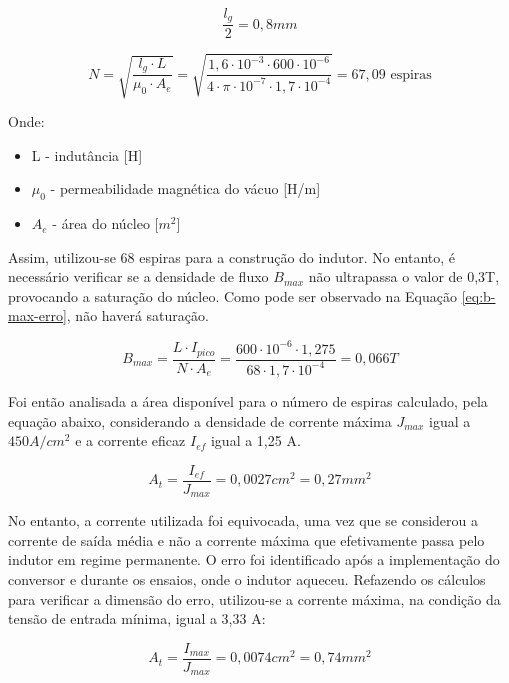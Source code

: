 \documentclass[a4paper]{article}
\begin{document}
{\begin{equation*}
\frac{l_g}{2} = 0,8mm
\end{equation*}

\begin{equation*}
N = \sqrt{\frac{l_g \cdot L}{\mu_0 \cdot A_e}} = \sqrt{\frac{1,6 \cdot 10^{-3} \cdot 600 \cdot 10^{-6}}{4 \cdot \pi \cdot 10^{-7} \cdot 1,7 \cdot 10^{-4}}} = 67,09\text{ espiras}
\end{equation*}

Onde:
\begin{itemize}
\item L - indutância [H]
\item $\mu_0$ - permeabilidade magnética do vácuo [H/m]
\item $A_e$ - área do núcleo [$m^2$]
\end{itemize}

Assim, utilizou-se 68 espiras para a construção do indutor. No entanto, é necessário verificar se a densidade de fluxo $B_{max}$ não ultrapassa o valor de 0,3T, provocando a saturação do núcleo. Como pode ser observado na Equação \ref{eq:b-max-erro}, não haverá saturação.

\begin{equation}
\label{eq:b-max-erro}
B_{max} =  \frac{L \cdot I_{pico}}{N \cdot A_e} = \frac{600 \cdot 10^{-6} \cdot 1,275}{68 \cdot 1,7 \cdot 10^{-4}} = 0,066T
\end{equation}

Foi então analisada a área disponível para o número de espiras calculado, pela equação abaixo, considerando a densidade de corrente máxima $J_{max}$ igual a $450 A/cm^2$ e a corrente eficaz $I_{ef}$ igual a 1,25 A.

\begin{equation}
\label{eq:area-erro}
A_{t} = \frac{I_{ef}}{J_{max}} = 0,0027 cm^2 = 0,27 mm^2
\end{equation}

No entanto, a corrente utilizada foi equivocada, uma vez que se considerou a corrente de saída média e não a corrente máxima que efetivamente passa pelo indutor em regime permanente. O erro foi identificado após a implementação do conversor e durante os ensaios, onde o indutor aqueceu. Refazendo os cálculos para verificar a dimensão do erro, utilizou-se a corrente máxima, na condição da tensão de entrada mínima, igual a 3,33 A:

\begin{equation}
\label{eq:area-erro}
A_{t} = \frac{I_{max}}{J_{max}} = 0,0074 cm^2 = 0,74 mm^2
\end{equation}

}
\end{document}
